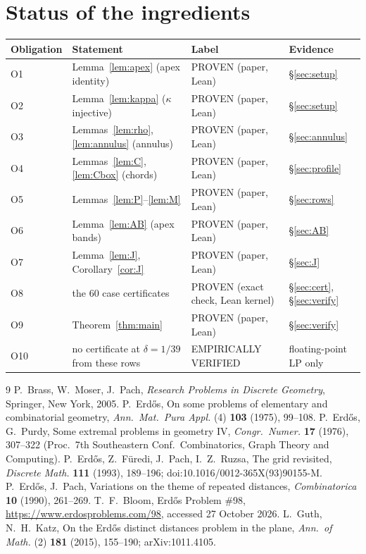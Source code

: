\documentclass[11pt]{article}
\theoremstyle{remark}
\begin{document}
\section{Status of the ingredients}

\begin{center}
\small
\begin{tabular}{lp{5.2cm}p{3.6cm}l}
\toprule
Obligation & Statement & Label & Evidence\\
\midrule
O1 & Lemma~\ref{lem:apex} (apex identity) & PROVEN (paper, Lean) & \S\ref{sec:setup}\\
O2 & Lemma~\ref{lem:kappa} ($\kappa$ injective) & PROVEN (paper, Lean) & \S\ref{sec:setup}\\
O3 & Lemmas~\ref{lem:rho}, \ref{lem:annulus} (annulus) & PROVEN (paper, Lean) & \S\ref{sec:annulus}\\
O4 & Lemmas~\ref{lem:C}, \ref{lem:Cbox} (chords) & PROVEN (paper, Lean) & \S\ref{sec:profile}\\
O5 & Lemmas~\ref{lem:P}--\ref{lem:M} & PROVEN (paper, Lean) & \S\ref{sec:rows}\\
O6 & Lemma~\ref{lem:AB} (apex bands) & PROVEN (paper, Lean) & \S\ref{sec:AB}\\
O7 & Lemma~\ref{lem:J}, Corollary~\ref{cor:J} & PROVEN (paper, Lean) & \S\ref{sec:J}\\
O8 & the 60 case certificates & PROVEN (exact check, Lean kernel) & \S\ref{sec:cert}, \S\ref{sec:verify}\\
O9 & Theorem~\ref{thm:main} & PROVEN (paper, Lean) & \S\ref{sec:verify}\\
O10 & no certificate at $\delta = 1/39$ from these rows & EMPIRICALLY VERIFIED & floating-point LP only\\
\bottomrule
\end{tabular}
\end{center}

\begin{thebibliography}{9}
 P.~Brass, W.~Moser, J.~Pach, \emph{Research Problems in
  Discrete Geometry}, Springer, New York, 2005.
 P.~Erd\H{o}s, On some problems of elementary and combinatorial
  geometry, \emph{Ann.\ Mat.\ Pura Appl.} (4) \textbf{103} (1975), 99--108.
 P.~Erd\H{o}s, G.~Purdy, Some extremal problems in geometry
  IV, \emph{Congr.\ Numer.} \textbf{17} (1976), 307--322 (Proc.\ 7th
  Southeastern Conf.\ Combinatorics, Graph Theory and Computing).
 P.~Erd\H{o}s, Z.~F\"uredi, J.~Pach, I.~Z.~Ruzsa, The grid
  revisited, \emph{Discrete Math.} \textbf{111} (1993), 189--196;
  doi:10.1016/0012-365X(93)90155-M.
 P.~Erd\H{o}s, J.~Pach, Variations on the theme of repeated
  distances, \emph{Combinatorica} \textbf{10} (1990), 261--269.
 T.~F.~Bloom, Erd\H{o}s Problem \#98,
  \url{https://www.erdosproblems.com/98}, accessed 27 October 2026.
 L.~Guth, N.~H.~Katz, On the Erd\H{o}s distinct distances
  problem in the plane, \emph{Ann.\ of Math.} (2) \textbf{181} (2015),
  155--190; arXiv:1011.4105.
\end{thebibliography}
\end{document}
